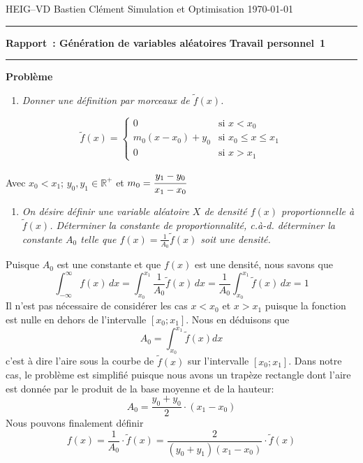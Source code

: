 \documentclass[a4paper,11pt]{report}
\newcounter{numero}
\newcommand{\exo}{
	{\large
		\vspace{5mm}
		\addtocounter{numero}{1}
		{\bf Problème~\thenumero}
		\vspace{2mm}
	}
}
\newcommand{\point}[2]{
	\vspace{0.2mm}
	\begin{enumerate}[\indent #1)]
	\item {\em #2}
	\end{enumerate}
}
\begin{document}
	
{\sc HEIG--VD} \hfill Bastien Clément\newline 
Simulation et Optimisation \hfill \today \newline
\hrule
\vspace{2mm}
{\large \bf Rapport~: Génération de variables aléatoires} \hfill {\large \bf Travail personnel~1}
\vspace{4mm}
\hrule

\exo
\point{a}{Donner une définition par morceaux de $\tilde{f}(x)$.}

\begin{equation*}
\tilde{f}(x) = \left\lbrace \begin{array}{ll}
	0						& \text{si $x < x_0$} \\
	m_0 ( x - x_0 ) + y_0	& \text{si $x_0 \leq x \leq x_1$} \\
	0 						& \text{si $x > x_1$}
\end{array} \right.
\end{equation*}
\begin{center}
	Avec $x_0 < x_1$; $y_0, y_1 \in \mathbb{R}^{+}$ et $m_0 = \cfrac{y_1-y_0}{x_1-x_0}$
\end{center}

\point{b}{On désire définir une variable aléatoire $X$ de densité $f(x)$ proportionnelle à $\tilde{f}(x)$. Déterminer la constante de proportionnalité, c.à-d. déterminer la constante $A_{0}$ telle que $f(x) = \frac{1}{A_{0}}\tilde{f}(x)$ soit une densité.}

Puisque $A_{0}$ est une constante et que $f(x)$ est une densité, nous savons que
\begin{equation*}
	\int_{-\infty}^{\infty} f(x)\,dx =
	\int_{x_0}^{x_1} \frac{1}{A_0} \tilde{f}(x)\,dx =
	\frac{1}{A_0} \int_{x_0}^{x_1} \tilde{f}(x)\,dx = 1
\end{equation*}
Il n'est pas nécessaire de considérer les cas $x < x_0$ et $x > x_1$ puisque la fonction est nulle en dehors de l'intervalle $[x_0; x_1]$. Nous en déduisons que
\begin{equation*}
	A_0 = \int_{x_0}^{x_1} \tilde{f}(x)dx
\end{equation*}
c'est à dire l'aire sous la courbe de $\tilde{f}(x)$ sur l'intervalle $[x_0; x_1]$. Dans notre cas, le problème est simplifié puisque nous avons un trapèze rectangle dont l'aire est donnée par le produit de la base moyenne et de la hauteur:
\begin{equation*}
	A_0 = \frac{y_0 + y_0}{2} \cdot (x_1 - x_0)
\end{equation*}
Nous pouvons finalement définir
\begin{equation*}
	f(x)	= \frac{1}{A_0} \cdot  \tilde{f}(x)
			= \frac{2}{(y_0 + y_1)(x_1 - x_0)} \cdot \tilde{f}(x)
\end{equation*}
\end{document}
